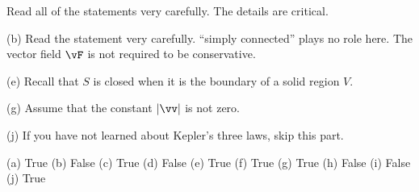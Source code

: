 \begin{hint} 
Read all of the statements very carefully. The details are critical.

(b) Read the statement very carefully.
  ``simply connected'' plays no role here. 
    The vector field $\vF$ is not required to be conservative.

(e) Recall that $S$ is closed when it is the boundary of a solid region $V$.

(g) Assume that the constant $|\vv|$ is not zero. 


(j) If you have not learned about Kepler's three laws, skip this part.



\end{hint}

\begin{answer} 
(a) True\qquad
(b) False\qquad
(c) True\qquad
(d) False\qquad
(e) True\qquad
(f) True\qquad
(g) True\qquad
(h) False\qquad
(i) False\qquad
(j) True

\end{answer}


